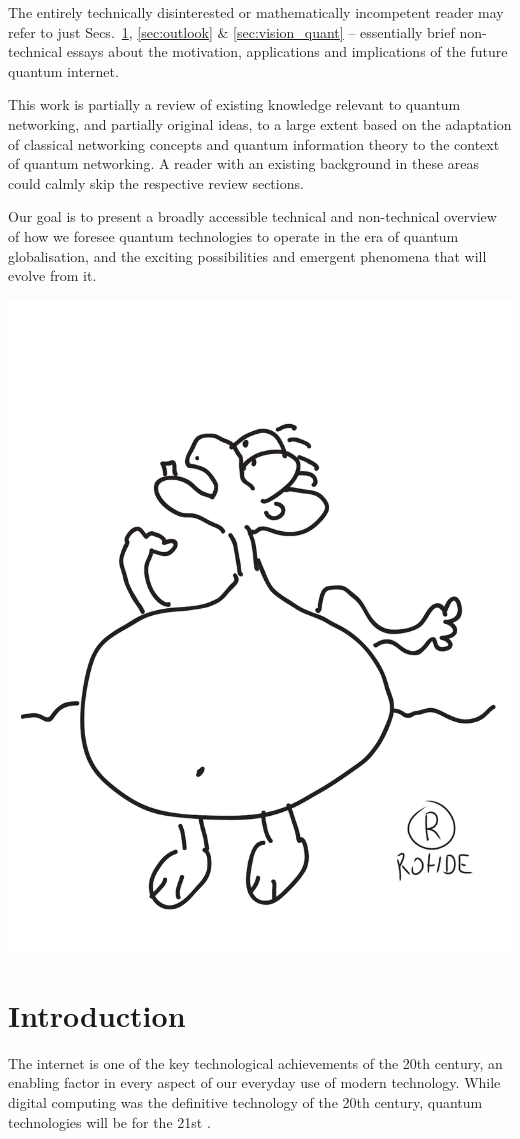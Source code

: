 \documentclass[aps, rmp, twocolumn, amsmath, amssymb, nofootinbib, superscriptaddress, longbibliography, floatfix, table-of-contents, eqsecnum]{revtex4-1}
\begin{document}
The entirely technically disinterested or mathematically incompetent reader may refer to just Secs.~\ref{sec:introduction}, \ref{sec:outlook} \& \ref{sec:vision_quant} -- essentially brief non-technical essays about the motivation, applications and implications of the future quantum internet.

This work is partially a review of existing knowledge relevant to quantum networking, and partially original ideas, to a large extent based on the adaptation of classical networking concepts and quantum information theory to the context of quantum networking. A reader with an existing background in these areas could calmly skip the respective review sections.

Our goal is to present a broadly accessible technical and non-technical overview of how we foresee quantum technologies to operate in the era of quantum globalisation, and the exciting possibilities and emergent phenomena that will evolve from it.

\begin{center}
	\includegraphics[width=0.6\columnwidth]{sketch_1}
\end{center}

%
%

\section{Introduction} \label{sec:introduction}

The internet is one of the key technological achievements of the 20th century, an enabling factor in every aspect of our everyday use of modern technology. While digital computing was the definitive technology of the 20th century, quantum technologies will be for the 21st \cite{bib:NielsenChuang00, bib:Bennett00}. 
\end{document}
